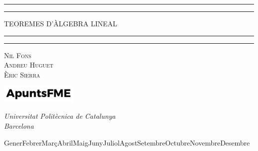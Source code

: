 \newcommand{\plogo}{\fbox{$\mathcal{PL}$}} %
{

    \centering %

    \scshape %

    \rule{\textwidth}{1.6pt}\vspace*{-\baselineskip}\vspace*{2pt} %
    \rule{\textwidth}{0.4pt} %

    \vspace{0.40\baselineskip} %

    {\LARGE TEOREMES D'ÀLGEBRA LINEAL} %

    \vspace{0.01\baselineskip} %

    \rule{\textwidth}{0.4pt}\vspace*{-\baselineskip}\vspace{3.2pt} %
    \rule{\textwidth}{1.6pt} %

    \vspace{0.5\baselineskip} %

    {\scshape\large Nil Fons \\ Andreu Huguet \\ Èric Sierra\\} %

    \vspace{1.5\baselineskip} %

    \includegraphics[width=3.7cm]{../logo.pdf}

    \vspace{-0.3\baselineskip} %
    
    \textit{Universitat Politècnica de Catalunya \\ Barcelona} %
        
    
    {\ifcase \month \or Gener\or Febrer\or Març\or Abril\or Maig\or Juny\or Juliol\or Agost\or Setembre\or Octubre\or Novembre\or Desembre\fi \:  \number \year} %


}
